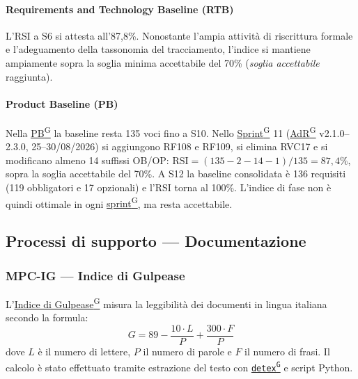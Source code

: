 \documentclass[a4paper,12pt]{article}
\providecommand{\glslink}[2]{\href{https://alittlebyte-19.github.io/Documentazione/glossario.html\#gls-#1}{\underline{#2}\textsuperscript{\scriptsize G}}}
\begin{document}
\paragraph*{Requirements and Technology Baseline (RTB)} L'RSI a S6 si attesta all'87,8\%. Nonostante l'ampia attività di riscrittura formale e l'adeguamento della tassonomia del tracciamento, l'indice si mantiene ampiamente sopra la soglia minima accettabile del 70\% (\emph{soglia accettabile} raggiunta).

\paragraph*{Product Baseline (PB)} Nella \glslink{pb-product-baseline}{PB} la baseline resta 135 voci fino a S10. Nello \glslink{sprint}{Sprint} 11 (\glslink{analisi-dei-requisiti-adr}{AdR} v2.1.0--2.3.0, 25--30/08/2026) si aggiungono RF108 e RF109, si elimina RVC17 e si modificano almeno 14 suffissi OB/OP: $\text{RSI} = (135-2-14-1)/135 = 87{,}4\%$, sopra la soglia accettabile del 70\%. A S12 la baseline consolidata è 136 requisiti (119 obbligatori e 17 opzionali) e l'RSI torna al 100\%. L'indice di fase non è quindi ottimale in ogni \glslink{sprint}{sprint}, ma resta accettabile.

\subsection{Processi di supporto — Documentazione}

\subsubsection{MPC-IG — Indice di Gulpease}

L'\glslink{indice-di-gulpease-mpc-ig}{Indice di Gulpease} misura la leggibilità dei documenti in lingua italiana secondo la formula:
\[
  G = 89 - \frac{10 \cdot L}{P} + \frac{300 \cdot F}{P}
\]
dove $L$ è il numero di lettere, $P$ il numero di parole e $F$ il numero di frasi. Il calcolo è stato effettuato tramite estrazione del testo con \texttt{\glslink{detex}{detex}} e script Python.
\end{document}
